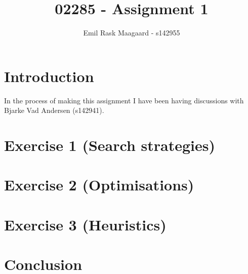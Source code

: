 \documentclass{dtu_report_short}
\title{02285 - Assignment 1}
\author{Emil Rask Maagaard - s142955}
\begin{document}
\maketitle{}


\section{Introduction}

In the process of making this assignment I have been having discussions with Bjarke Vad Andersen (s142941). 


\section{Exercise 1 (Search strategies)}


\section{Exercise 2 (Optimisations)}


\section{Exercise 3 (Heuristics)}



\section{Conclusion}

\end{document}
